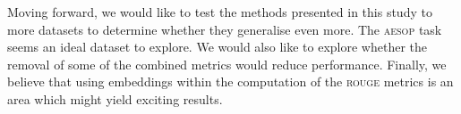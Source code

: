 \documentclass[11pt,a4paper]{article}
\newcommand{\rouge}{\textsc{rouge}\xspace}
\begin{document}
Moving forward, we would like to test the methods presented in this study to more datasets to determine 
whether they generalise even more. The \textsc{aesop} task seems an ideal dataset to explore. We would 
also like to explore whether the removal of some of the combined metrics would reduce performance. Finally, 
we believe that using embeddings within the computation of the \rouge metrics is an area which might 
yield exciting results.




\end{document}
